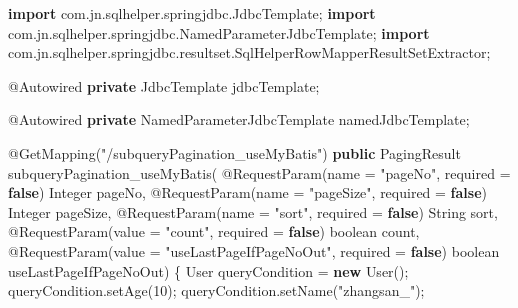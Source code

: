 \documentclass[
]{book}
\newenvironment{Shaded}{\begin{snugshade}}{\end{snugshade}}
\newcommand{\AttributeTok}[1]{\textcolor[rgb]{0.77,0.63,0.00}{#1}}
\newcommand{\BuiltInTok}[1]{#1}
\newcommand{\DataTypeTok}[1]{\textcolor[rgb]{0.13,0.29,0.53}{#1}}
\newcommand{\DecValTok}[1]{\textcolor[rgb]{0.00,0.00,0.81}{#1}}
\newcommand{\FunctionTok}[1]{\textcolor[rgb]{0.00,0.00,0.00}{#1}}
\newcommand{\ImportTok}[1]{#1}
\newcommand{\KeywordTok}[1]{\textcolor[rgb]{0.13,0.29,0.53}{\textbf{#1}}}
\newcommand{\NormalTok}[1]{#1}
\newcommand{\StringTok}[1]{\textcolor[rgb]{0.31,0.60,0.02}{#1}}
\begin{document}
\begin{Shaded}
\begin{Highlighting}[]
    
    \KeywordTok{import}\ImportTok{ com.jn.sqlhelper.springjdbc.JdbcTemplate;}
    \KeywordTok{import}\ImportTok{ com.jn.sqlhelper.springjdbc.NamedParameterJdbcTemplate;}
    \KeywordTok{import}\ImportTok{ com.jn.sqlhelper.springjdbc.resultset.SqlHelperRowMapperResultSetExtractor;}
    
    \AttributeTok{@Autowired}
    \KeywordTok{private}\NormalTok{ JdbcTemplate jdbcTemplate;}

    \AttributeTok{@Autowired}
    \KeywordTok{private}\NormalTok{ NamedParameterJdbcTemplate namedJdbcTemplate;}
    
    
    \AttributeTok{@GetMapping}\NormalTok{(}\StringTok{"/subqueryPagination_useMyBatis"}\NormalTok{)}
    \KeywordTok{public}\NormalTok{ PagingResult }\FunctionTok{subqueryPagination_useMyBatis}\NormalTok{(}
            \AttributeTok{@RequestParam}\NormalTok{(name = }\StringTok{"pageNo"}\NormalTok{, required = }\KeywordTok{false}\NormalTok{) }\BuiltInTok{Integer}\NormalTok{ pageNo,}
            \AttributeTok{@RequestParam}\NormalTok{(name = }\StringTok{"pageSize"}\NormalTok{, required = }\KeywordTok{false}\NormalTok{) }\BuiltInTok{Integer}\NormalTok{ pageSize,}
            \AttributeTok{@RequestParam}\NormalTok{(name = }\StringTok{"sort"}\NormalTok{, required = }\KeywordTok{false}\NormalTok{) }\BuiltInTok{String}\NormalTok{ sort,}
            \AttributeTok{@RequestParam}\NormalTok{(value = }\StringTok{"count"}\NormalTok{, required = }\KeywordTok{false}\NormalTok{) }\DataTypeTok{boolean}\NormalTok{ count,}
            \AttributeTok{@RequestParam}\NormalTok{(value = }\StringTok{"useLastPageIfPageNoOut"}\NormalTok{, required = }\KeywordTok{false}\NormalTok{) }\DataTypeTok{boolean}\NormalTok{ useLastPageIfPageNoOut) \{}
\NormalTok{        User queryCondition = }\KeywordTok{new} \FunctionTok{User}\NormalTok{();}
\NormalTok{        queryCondition.}\FunctionTok{setAge}\NormalTok{(}\DecValTok{10}\NormalTok{);}
\NormalTok{        queryCondition.}\FunctionTok{setName}\NormalTok{(}\StringTok{"zhangsan_"}\NormalTok{);}



\end{Highlighting}
\end{Shaded}
\end{document}
